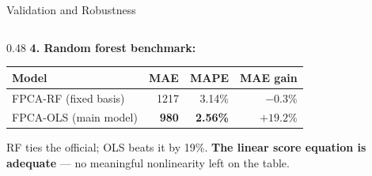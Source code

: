 \documentclass[10pt,aspectratio=169]{beamer}
\begin{document}
\begin{frame}{Validation and Robustness}
\begin{columns}
\begin{column}{0.48\textwidth}
    \vspace{0.5em}
    \textbf{4. Random forest benchmark:}
    \begin{center}
    \scriptsize
    \begin{tabular}{lrrr}
      \toprule
      Model & MAE & MAPE & MAE gain \\
      \midrule
      FPCA-RF (fixed basis) & 1217 & 3.14\% & $-0.3\%$ \\
      FPCA-OLS (main model) & \textbf{980} & \textbf{2.56\%} & $+19.2\%$ \\
      \bottomrule
    \end{tabular}
    \end{center}
    RF ties the official; OLS beats it by 19\%.
    \textbf{The linear score equation is adequate} ---
    no meaningful nonlinearity left on the table.
  \end{column}
  \end{columns}
\end{frame}
\end{document}
